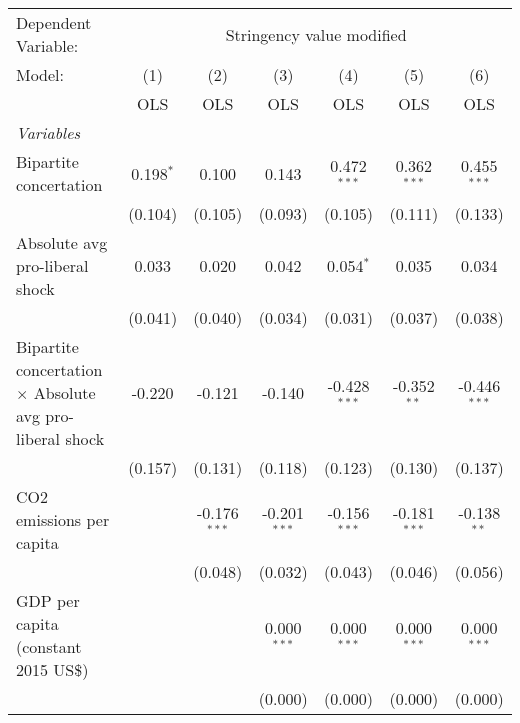 
\begingroup
\centering
\begin{tabular}{lcccccc}
   \toprule
   Dependent Variable: & \multicolumn{6}{c}{Stringency value modified}\\
   Model:                                                          & (1)         & (2)            & (3)            & (4)            & (5)            & (6)\\  
                                                                   &  OLS        & OLS            & OLS            & OLS            & OLS            & OLS\\  
   \midrule
   \emph{Variables}\\
   Bipartite concertation                                          & 0.198$^{*}$ & 0.100          & 0.143          & 0.472$^{***}$  & 0.362$^{***}$  & 0.455$^{***}$\\   
                                                                   & (0.104)     & (0.105)        & (0.093)        & (0.105)        & (0.111)        & (0.133)\\   
   Absolute avg pro-liberal shock                                  & 0.033       & 0.020          & 0.042          & 0.054$^{*}$    & 0.035          & 0.034\\   
                                                                   & (0.041)     & (0.040)        & (0.034)        & (0.031)        & (0.037)        & (0.038)\\   
   Bipartite concertation $\times$ Absolute avg pro-liberal shock  & -0.220      & -0.121         & -0.140         & -0.428$^{***}$ & -0.352$^{**}$  & -0.446$^{***}$\\   
                                                                   & (0.157)     & (0.131)        & (0.118)        & (0.123)        & (0.130)        & (0.137)\\   
   CO2 emissions per capita                                        &             & -0.176$^{***}$ & -0.201$^{***}$ & -0.156$^{***}$ & -0.181$^{***}$ & -0.138$^{**}$\\   
                                                                   &             & (0.048)        & (0.032)        & (0.043)        & (0.046)        & (0.056)\\   
   GDP per capita (constant 2015 US\$)                             &             &                & 0.000$^{***}$  & 0.000$^{***}$  & 0.000$^{***}$  & 0.000$^{***}$\\   
                                                                   &             &                & (0.000)        & (0.000)        & (0.000)        & (0.000)\\   

\end{tabular}
